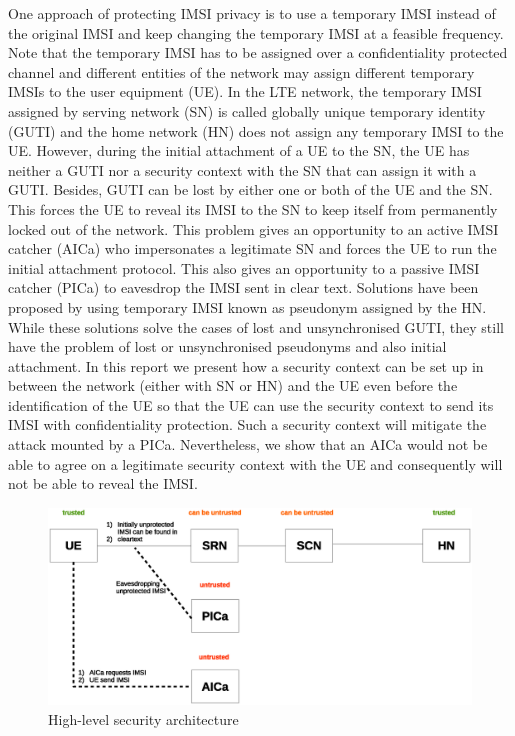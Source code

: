 \documentclass[lnicst,sechang,a4paper]{svmultln}
\begin{document}
One approach of protecting IMSI privacy is to use a temporary IMSI instead of the original IMSI and keep changing the temporary IMSI at a feasible frequency. Note that the temporary IMSI has to be assigned over a confidentiality protected channel and different entities of the network may assign different temporary IMSIs to the user equipment (UE). In the LTE network, the temporary IMSI assigned by serving network (SN) is called globally unique temporary identity (GUTI) and the home network (HN) does not assign any temporary IMSI to the UE. However, during the initial attachment of a UE to the SN, the UE has neither a GUTI nor a security context with the SN that can assign it with a GUTI. Besides, GUTI can be lost by either one or both of the UE and the SN. This forces the UE to reveal its IMSI to the SN to keep itself from permanently locked out of the network. This problem gives an opportunity to an active IMSI catcher (AICa) who impersonates a legitimate SN and forces the UE to run the initial attachment protocol. This also gives an opportunity to a passive IMSI catcher (PICa) to eavesdrop the IMSI sent in clear text. Solutions \cite{pseudonym_valtteri_philip, pseudonym_ericsson} have been proposed by using temporary IMSI known as pseudonym assigned by the HN. While these solutions solve the cases of lost and unsynchronised GUTI, they still have the problem of lost or unsynchronised pseudonyms and also initial attachment. In this report we present how a security context can be set up in between the network (either with SN or HN) and the UE even before the identification of the UE so that the UE can use the security context to send its IMSI with confidentiality protection. Such a security context will mitigate the attack mounted by a PICa. Nevertheless, we show that an AICa would not be able to agree on a legitimate security context with the UE and consequently will not be able to reveal the IMSI.

\begin{figure}
\begin{center}
  \includegraphics[width=.98\textwidth]{security_architecture_abstraction.eps}
\caption{High-level security architecture}
\label{fig:security_architecture_abstraction}       %
\end{center}
\end{figure}
\end{document}
